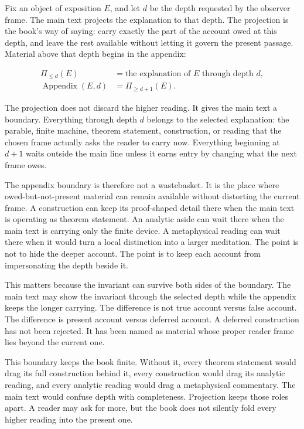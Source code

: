 Fix an object of exposition \(E\), and let \(d\) be the depth requested by the
observer frame. The main text projects the explanation to that depth. The
projection is the book's way of saying: carry exactly the part of the account
owed at this depth, and leave the rest available without letting it govern the
present passage. Material above that depth begins in the appendix:

\[
\begin{aligned}
\Pi_{\le d}(E) &=
  \text{the explanation of }E\text{ through depth }d,\\
\operatorname{Appendix}(E,d) &= \Pi_{\ge d+1}(E).
\end{aligned}
\]

The projection does not discard the higher reading. It gives the main text a
boundary. Everything through depth \(d\) belongs to the selected explanation:
the parable, finite machine, theorem statement, construction, or reading that
the chosen frame actually asks the reader to carry now. Everything beginning at
\(d+1\) waits outside the main line unless it earns entry by changing what the
next frame owes.

The appendix boundary is therefore not a wastebasket. It is the place where
owed-but-not-present material can remain available without distorting the
current frame. A construction can keep its proof-shaped detail there when the
main text is operating as theorem statement. An analytic aside can wait there
when the main text is carrying only the finite device. A metaphysical reading
can wait there when it would turn a local distinction into a larger meditation.
The point is not to hide the deeper account. The point is to keep each account
from impersonating the depth beside it.

This matters because the invariant can survive both sides of the boundary. The
main text may show the invariant through the selected depth while the appendix
keeps the longer carrying. The difference is not true account versus false
account. The difference is present account versus deferred account. A deferred
construction has not been rejected. It has been named as material whose proper
reader frame lies beyond the current one.

This boundary keeps the book finite. Without it, every theorem statement would
drag its full construction behind it, every construction would drag its analytic
reading, and every analytic reading would drag a metaphysical commentary. The
main text would confuse depth with completeness. Projection keeps those roles
apart. A reader may ask for more, but the book does not silently fold every
higher reading into the present one.

